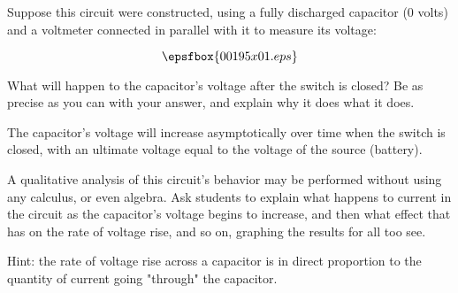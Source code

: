 

Suppose this circuit were constructed, using a fully discharged capacitor (0 volts) and a voltmeter connected in parallel with it to measure its voltage:

$$\epsfbox{00195x01.eps}$$

What will happen to the capacitor's voltage after the switch is closed?  Be as precise as you can with your answer, and explain why it does what it does.

\vskip 30pt







The capacitor's voltage will increase asymptotically over time when the switch is closed, with an ultimate voltage equal to the voltage of the source (battery).







A qualitative analysis of this circuit's behavior may be performed without using any calculus, or even algebra.  Ask students to explain what happens to current in the circuit as the capacitor's voltage begins to increase, and then what effect that has on the rate of voltage rise, and so on, graphing the results for all too see.

Hint: the rate of voltage rise across a capacitor is in direct proportion to the quantity of current going "through" the capacitor.




